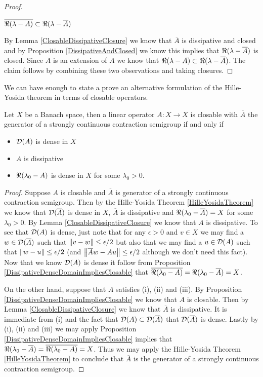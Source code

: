 \begin{proof}
\begin{clm} $\overline{\Re(\lambda -A)} \subset\Re(\lambda - \overline{A}) $
\end{clm}
By Lemma \ref{ClosableDissipativeClosure} we know that $\overline{A}$ is dissipative and closed and 
by Proposition \ref{DissipativeAndClosed} we know this implies that $\Re(\lambda - \overline{A})$ is closed.  Since $\overline{A}$ is an
extension of $A$ we know that $\Re(\lambda - A) \subset \Re(\lambda - \overline{A})$.  The claim follows by combining these two observations and taking closures.
\end{proof}

We can have enough to state a prove an alternative formulation of the Hille-Yosida theorem in terms of closable operators.
\begin{thm}\label{HilleYosidaTheoremClosable}Let $X$ be a Banach space, then a linear operator $A : X \to X$ is closable with $\overline{A}$ the generator of a strongly continuous contraction semigroup if and only if 
\begin{itemize}
\item[(i)] $ \mathcal{D}(A)$ is dense in $X$
\item[(ii)] $A$ is dissipative
\item[(iii)] $\Re(\lambda_0 -A)$ is dense in $X$ for some $\lambda_0 > 0$.
\end{itemize}
\end{thm}
\begin{proof}
Suppose $A$ is closable and $\overline{A}$ is generator of a strongly continuous contraction semigroup.  Then by the Hille-Yosida Theorem \ref{HilleYosidaTheorem} we know that $\mathcal{D}(\overline{A})$ is dense in $X$, $\overline{A}$ is dissipative and $\Re(\lambda_0 - \overline{A}) = X$ for some $\lambda_0 > 0$.  By Lemma \ref{ClosableDissipativeClosure} we know that $A$ is dissipative.   To see that $\mathcal{D}(A)$ is dense,  just note that for any $\epsilon > 0$ and $v \in X$ we may find a $w \in \mathcal{D}(\overline{A})$ such that $\left \lVert v - w \right \rVert \leq \epsilon/2$ but also that we may find a $u \in \mathcal{D}(A)$ such that $\left \lVert w - u \right \rVert \leq \epsilon/2$ (and $\left \lVert \overline{A}w - Au \right \rVert \leq \epsilon/2$ although we don't need this fact).  Now that we know $\mathcal{D}(A)$ is dense it follow from Proposition \ref{DissipativeDenseDomainImpliesClosable} that $\overline{\Re(\lambda_0 - A)} = \Re(\lambda_0 - \overline{A})=X$.

On the other hand, suppose that $A$ satisfies (i), (ii) and (iii).  By Proposition \ref{DissipativeDenseDomainImpliesClosable} we know that $A$ is closable.  Then by Lemma \ref{ClosableDissipativeClosure} we know that $\overline{A}$ is dissipative.  It is immediate from (i) and the fact that $\mathcal{D}(A) \subset \mathcal{D}(\overline{A})$ that $\mathcal{D}(\overline{A})$ is dense.  Lastly by (i), (ii) and (iii) we may apply Proposition \ref{DissipativeDenseDomainImpliesClosable} implies that $\Re(\lambda_0 - \overline{A}) = \overline{\Re(\lambda_0 - A)} =X$.  Thus we may apply the Hille-Yosida Theorem \ref{HilleYosidaTheorem} to conclude that $\overline{A}$ is the generator of a strongly continuous contraction semigroup.
\end{proof}

